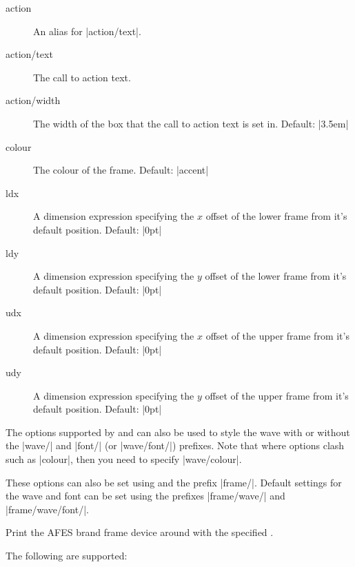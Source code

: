 \documentclass[a4paper]{l3doc}
\begin{document}
\begin{description}
  \item[action] An alias for |action/text|.
  \item[action/text] The call to action text.
  \item[action/width] The width of the box that the call to action text is set
    in. Default: |3.5em|
  \item[colour] The colour of the frame. Default: |accent|
  \item[ldx] A dimension expression specifying the $x$ offset of the lower
    frame from it's default position. Default: |0pt|
  \item[ldy] A dimension expression specifying the $y$ offset of the lower
    frame from it's default position. Default: |0pt|
  \item[udx] A dimension expression specifying the $x$ offset of the upper
    frame from it's default position. Default: |0pt|
  \item[udy] A dimension expression specifying the $y$ offset of the upper
    frame from it's default position. Default: |0pt|
\end{description}

The options supported by  and 
can also be used to style the wave with or without the |wave/| and |font/| (or
|wave/font/|) prefixes. Note that where options clash such as |colour|, then
you need to specify |wave/colour|.

These options can also be set using  and the prefix
|frame/|. Default settings for the wave and font can be set using the prefixes
|frame/wave/| and |frame/wave/font/|.

\begin{function}{\AFESBrandFrameImage}
  \begin{syntax}
  \end{syntax}
  Print the AFES brand frame device around  with the specified
  .
\end{function}

{\centering{}\par}

The following  are supported:
\end{document}
